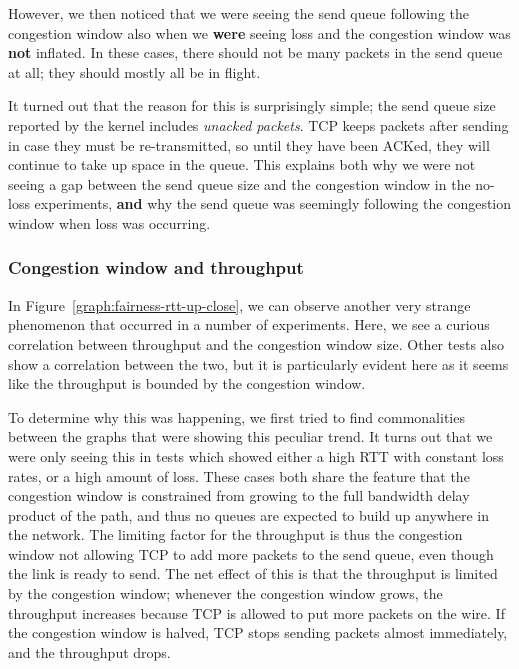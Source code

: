 However, we then noticed that we were seeing the send queue following the
congestion window also when we \textbf{were} seeing loss and the congestion
window was \textbf{not} inflated. In these cases, there should not be many
packets in the send queue at all; they should mostly all be in flight.

It turned out that the reason for this is surprisingly simple; the send queue
size reported by the kernel includes \textit{unacked packets}. TCP keeps packets
after sending in case they must be re-transmitted, so until they have been
ACKed, they will continue to take up space in the queue. This explains both why
we were not seeing a gap between the send queue size and the congestion window
in the no-loss experiments, \textbf{and} why the send queue was seemingly
following the congestion window when loss was occurring.

\subsubsection{Congestion window and throughput}

In Figure~\ref{graph:fairness-rtt-up-close}, we can observe another very strange
phenomenon that occurred in a number of experiments. Here, we see a curious
correlation between throughput and the congestion window size. Other tests also
show a correlation between the two, but it is particularly evident here as it 
seems like the throughput is bounded by the congestion window.

To determine why this was happening, we first tried to find commonalities
between the graphs that were showing this peculiar trend. It turns out that we
were only seeing this in tests which showed either a high RTT with constant loss
rates, or a high amount of loss. These cases both share the feature that the
congestion window is constrained from growing to the full bandwidth delay
product of the path, and thus no queues are expected to build up anywhere in the
network. The limiting factor for the throughput is thus the congestion window not
allowing TCP to add more packets to the send queue, even though the link is
ready to send. The net effect of this is that the throughput is limited by the
congestion window; whenever the congestion window grows, the throughput
increases because TCP is allowed to put more packets on the wire. If the
congestion window is halved, TCP stops sending packets almost immediately, and
the throughput drops.

